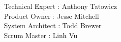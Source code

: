 Technical Expert : Anthony Tatowicz
\\Product Owner : Jesse Mitchell
\\System Architect : Todd Brewer
\\Scrum Master : Linh Vu